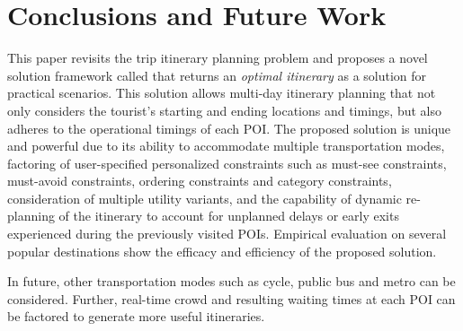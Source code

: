 \section{Conclusions and Future Work}
\label{Conclusions}

This paper revisits the trip itinerary planning problem and proposes a novel solution framework called \trip that returns an \emph{optimal itinerary} as a solution for practical scenarios. This solution allows multi-day itinerary planning that not only considers the tourist's starting and ending locations and timings, but also adheres to the operational timings of each POI. The proposed solution is unique and powerful due to its ability to accommodate multiple transportation modes, factoring of user-specified personalized constraints such as must-see constraints, must-avoid constraints, ordering constraints and category constraints, consideration of multiple utility variants, and the capability of dynamic re-planning of the itinerary to account for unplanned delays or early exits experienced during the previously visited POIs. Empirical evaluation on several popular destinations show the efficacy and efficiency of the proposed solution.

In future, other transportation modes such as cycle, public bus and metro can be considered. Further, real-time crowd and resulting waiting times at each POI can be factored to generate more useful itineraries.

